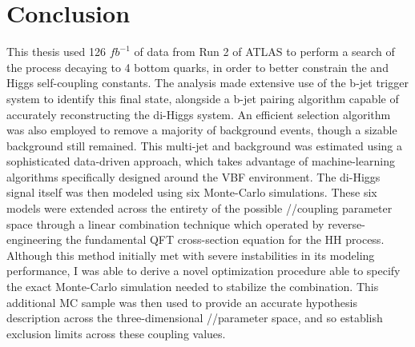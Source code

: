 \chapter{Conclusion}\label{chapter:conclusion}

This thesis used 126 $\textit{fb}^{-1}$ of data from Run 2 of ATLAS
    to perform a search of the \hhproc process decaying to 4 bottom quarks,
    in order to better constrain the \kl and \kvv Higgs self-coupling constants.
The analysis made extensive use of the b-jet trigger system to identify this final state,
    alongside a b-jet pairing algorithm capable of accurately reconstructing the di-Higgs system.
An efficient selection algorithm was also employed to remove a majority of background events,
    though a sizable background still remained.
This multi-jet and \ttbar background was estimated using a sophisticated data-driven approach,
    which takes advantage of machine-learning algorithms specifically designed around the VBF environment.
The di-Higgs signal itself was then modeled using six Monte-Carlo simulations.
These six models were extended across the entirety of the possible \kvv/\kl/\kvv coupling parameter space
    through a linear combination technique
    which operated by reverse-engineering the fundamental QFT cross-section equation for the HH process.
Although this method initially met with severe instabilities in its modeling performance,
    I was able to derive a novel optimization procedure able to specify
    the exact Monte-Carlo simulation needed to stabilize the combination.
This additional MC sample was then used to provide an accurate hypothesis description across
    the three-dimensional \kvv/\kl/\kv parameter space,
    and so establish exclusion limits across these coupling values. 

